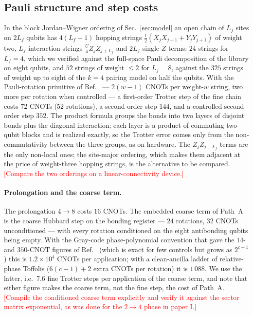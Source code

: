 \documentclass[
  aps,
  prc,
  reprint,
  superscriptaddress,
  floatfix,
  nofootinbib
]{revtex4-2}
\newcommand{\todo}[1]{\textcolor{red}{[#1]}}
\begin{document}
\subsection{Pauli structure and step costs}
In the block Jordan--Wigner ordering of Sec.~\ref{sec:model} an open chain
of $L_f$ sites on $2L_f$ qubits has $4(L_f-1)$ hopping strings
$\tfrac t2(X_jX_{j+1}+Y_jY_{j+1})$ of weight two, $L_f$ interaction strings
$\tfrac U4Z_jZ_{j+L_f}$ and $2L_f$ single-$Z$ terms: $24$ strings for
$L_f=4$, which we verified against the full-space Pauli decomposition of the
library on eight qubits, and $52$ strings of weight $\le2$ for $L_f=8$,
against the $325$ strings of weight up to eight of the $k=4$ pairing model
on half the qubits.  With the Pauli-rotation primitive of
Ref.~\cite{EigenQPairing2026} --- $2(w-1)$ CNOTs per weight-$w$ string, two
more per rotation when controlled --- a first-order Trotter step of the fine
chain costs $72$ CNOTs ($52$ rotations), a second-order step $144$, and a
controlled second-order step $352$.  The product formula groups the bonds
into two layers of disjoint bonds plus the diagonal interaction; each layer
is a product of commuting two-qubit blocks and is realized exactly, so the
Trotter error comes only from the non-commutativity between the three
groups, as on hardware.  The $Z_jZ_{j+L_f}$ terms are the only non-local
ones; the site-major ordering, which makes them adjacent at the price of
weight-three hopping strings, is the alternative to be compared.
\todo{Compare the two orderings on a linear-connectivity device.}

\paragraph{Prolongation and the coarse term.}
The prolongation $4\to8$ costs $16$ CNOTs.  The embedded coarse term of
Path~A is the coarse Hubbard step on the bonding register --- $24$
rotations, $32$ CNOTs unconditioned --- with every rotation conditioned on
the eight antibonding qubits being empty.  With the Gray-code
phase-polynomial convention that gave the $14$- and $350$-CNOT figures of
Ref.~\cite{EigenQPairing2026} (which is exact for few controls but grows as
$2^{c+1}$) this is $1.2\times10^4$ CNOTs per application; with a
clean-ancilla ladder of relative-phase Toffolis ($6(c-1)+2$ extra CNOTs per
rotation) it is $1\,088$.  We use the latter, i.e.\ $7.6$ fine Trotter steps
per application of the coarse term, and note that either figure makes the
coarse term, not the fine step, the cost of Path~A.  \todo{Compile the
conditioned coarse term explicitly and verify it against the sector matrix
exponential, as was done for the $2\to4$ phase in paper I.}
\end{document}
